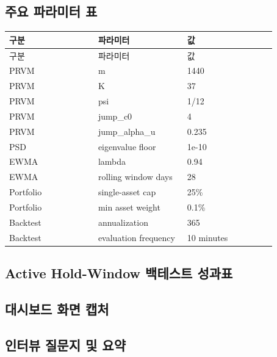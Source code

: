 \documentclass[12pt,a4paper]{article}
\begin{document}
\subsection{주요 파라미터 표}

\begin{center}
\small
\begin{longtable}{@{}p{0.32\linewidth}p{0.32\linewidth}p{0.32\linewidth}@{}}
\toprule
구분 & 파라미터 & 값 \\
\midrule
\endfirsthead
\toprule
구분 & 파라미터 & 값 \\
\midrule
\endhead
PRVM & m & 1440 \\
PRVM & K & 37 \\
PRVM & psi & 1/12 \\
PRVM & jump\_c0 & 4 \\
PRVM & jump\_alpha\_u & 0.235 \\
PSD & eigenvalue floor & 1e-10 \\
EWMA & lambda & 0.94 \\
EWMA & rolling window days & 28 \\
Portfolio & single-asset cap & 25\% \\
Portfolio & min asset weight & 0.1\% \\
Backtest & annualization & 365 \\
Backtest & evaluation frequency & 10 minutes \\
\bottomrule
\end{longtable}
\end{center}

\subsection{Active Hold-Window 백테스트 성과표}


\subsection{대시보드 화면 캡처}


\subsection{인터뷰 질문지 및 요약}
\end{document}
